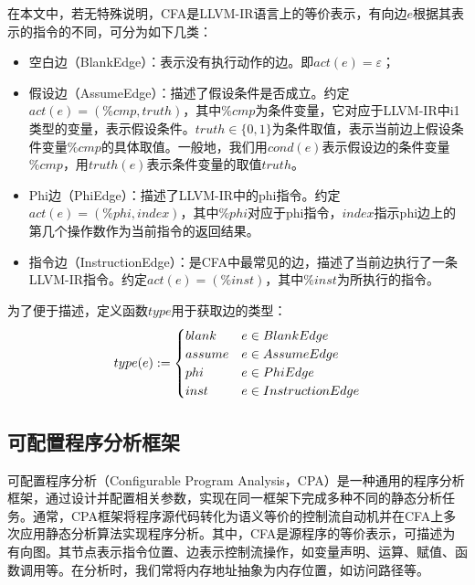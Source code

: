 在本文中，若无特殊说明，CFA是LLVM-IR语言上的等价表示，有向边$ e $根据其表示的指令的不同，可分为如下几类：
\begin{itemize}
	\item 空白边（BlankEdge）：表示没有执行动作的边。即$ act(e) = \varepsilon $；
	
	\item 假设边（AssumeEdge）：描述了假设条件是否成立。约定$ act(e) = (\%cmp, truth) $，其中$ \%cmp $为条件变量，它对应于LLVM-IR中i1类型的变量，表示假设条件。$ truth \in \{0, 1\}$为条件取值，表示当前边上假设条件变量$ \%cmp $的具体取值。一般地，我们用$ cond(e) $表示假设边的条件变量$ \%cmp $，用$ truth(e) $表示条件变量的取值$ truth $。
	
	\item Phi边（PhiEdge）：描述了LLVM-IR中的phi指令。约定$ act(e) = (\%phi, index) $，其中$ \%phi $对应于phi指令，$ index $指示phi边上的第几个操作数作为当前指令的返回结果。
	
	\item 指令边（InstructionEdge）：是CFA中最常见的边，描述了当前边执行了一条LLVM-IR指令。约定$ act(e) = (\%inst) $，其中$ \%inst $为所执行的指令。
	

\end{itemize}

为了便于描述，定义函数$ type $用于获取边的类型：
\begin{align}{\label{align:edgeType}}
	type(e) := \begin{cases}
		blank & e \in BlankEdge\\
		assume & e \in AssumeEdge\\
		phi & e \in PhiEdge\\
		inst & e \in InstructionEdge
	\end{cases}
\end{align}

\subsection{可配置程序分析框架} 

可配置程序分析（Configurable Program Analysis，CPA）是一种通用的程序分析框架，通过设计并配置相关参数，实现在同一框架下完成多种不同的静态分析任务。通常，CPA框架将程序源代码转化为语义等价的控制流自动机并在CFA上多次应用静态分析算法实现程序分析。其中，CFA是源程序的等价表示，可描述为有向图。其节点表示指令位置、边表示控制流操作，如变量声明、运算、赋值、函数调用等。在分析时，我们常将内存地址抽象为内存位置，如访问路径\cite{cheng2000modular}等。

